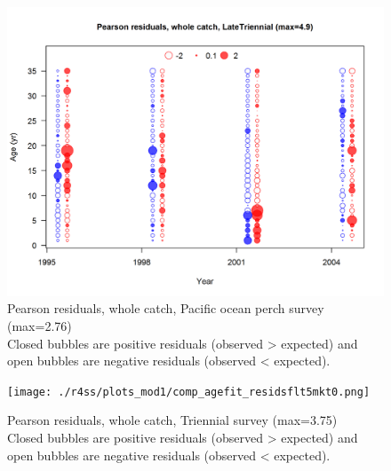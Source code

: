 \documentclass[12pt,]{article}
\begin{document}
\begin{figure}
\centering
\includegraphics{./r4ss/plots_mod1/comp_agefit_residsflt4mkt0.png}
\caption{Pearson residuals, whole catch, Pacific ocean perch survey
(max=2.76)\\
Closed bubbles are positive residuals (observed \textgreater{} expected)
and open bubbles are negative residuals (observed \textless{} expected).
\label{fig:pop_age_pearson}}
\end{figure}

\begin{figure}
\centering
\texttt{[image: ./r4ss/plots\_mod1/comp\_agefit\_residsflt5mkt0.png]}
\caption{Pearson residuals, whole catch, Triennial survey (max=3.75)\\
Closed bubbles are positive residuals (observed \textgreater{} expected)
and open bubbles are negative residuals (observed \textless{} expected).
\label{fig:tri_age_pearson}}
\end{figure}
\end{document}
